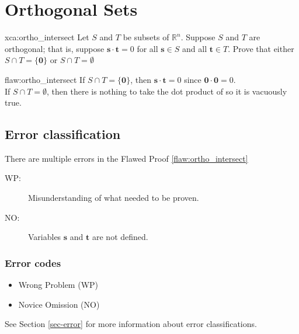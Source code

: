 \section{Orthogonal Sets}

\begin{xca}{xca:ortho_intersect}
 Let $S$ and $T$ be subsets of $\mathbb{R}^n$. Suppose $S$ and $T$ are orthogonal; that is, suppose $\bm{s}\cdot \bm{t} = 0$ for all $\bm{s}\in S$ and all $\bm{t} \in T$. Prove that either $S \cap T = \{\bm{0}\}$ or $S \cap T = \emptyset$
\end{xca}

\begin{flaw}{flaw:ortho_intersect} %
If $S \cap T = \{\bm{0}\}$, then $\bm{s} \cdot \bm{t} = 0$ since $\bm{0} \cdot \bm{0} = 0$.\\

\noindent If $S \cap T = \emptyset$, then there is nothing to take the dot product of so it is vacuously true.
\end{flaw}

\clearpage
\subsection{Error classification}


There are multiple errors
 in the Flawed Proof \ref{flaw:ortho_intersect}

 \begin{description}
    \item[WP:] Misunderstanding of what needed to be proven.
    \item[NO:] Variables $\bm{s}$ and $\bm{t}$ are not defined.
 \end{description}


\subsubsection{Error codes}
\begin{itemize}
    \item Wrong Problem (WP)
    \item Novice Omission (NO)
\end{itemize}
See Section \ref{sec-error} for more information about error classifications.

